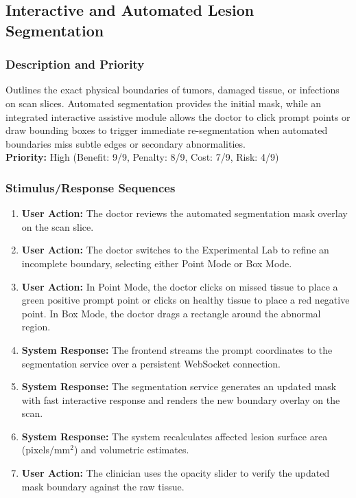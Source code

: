 \documentclass[12pt,a4paper]{report}
\begin{document}
\subsection{Interactive and Automated Lesion Segmentation}
\subsubsection{Description and Priority}
Outlines the exact physical boundaries of tumors, damaged tissue, or infections on scan slices. Automated segmentation provides the initial mask, while an integrated interactive assistive module allows the doctor to click prompt points or draw bounding boxes to trigger immediate re-segmentation when automated boundaries miss subtle edges or secondary abnormalities.\\
\textbf{Priority:} High (Benefit: 9/9, Penalty: 8/9, Cost: 7/9, Risk: 4/9)

\subsubsection{Stimulus/Response Sequences}
\begin{enumerate}
    \item \textbf{User Action:} The doctor reviews the automated segmentation mask overlay on the scan slice.
    \item \textbf{User Action:} The doctor switches to the Experimental Lab to refine an incomplete boundary, selecting either Point Mode or Box Mode.
    \item \textbf{User Action:} In Point Mode, the doctor clicks on missed tissue to place a green positive prompt point or clicks on healthy tissue to place a red negative point. In Box Mode, the doctor drags a rectangle around the abnormal region.
    \item \textbf{System Response:} The frontend streams the prompt coordinates to the segmentation service over a persistent WebSocket connection.
    \item \textbf{System Response:} The segmentation service generates an updated mask with fast interactive response and renders the new boundary overlay on the scan.
    \item \textbf{System Response:} The system recalculates affected lesion surface area (pixels/mm$^2$) and volumetric estimates.
    \item \textbf{User Action:} The clinician uses the opacity slider to verify the updated mask boundary against the raw tissue.
\end{enumerate}
\end{document}
